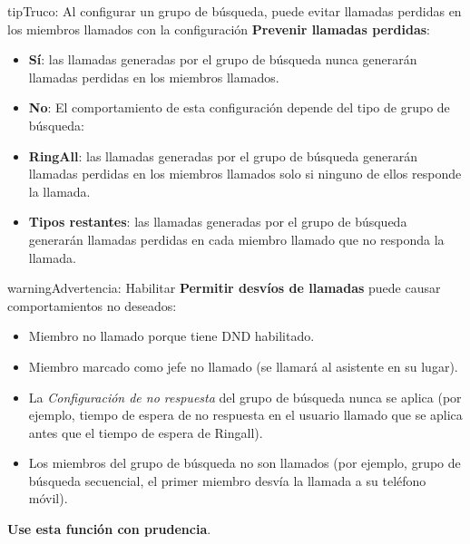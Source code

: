 \documentclass[letterpaper,10pt,spanish]{sphinxmanual}
\begin{document}
\begin{notice}{tip}{Truco:}
Al configurar un grupo de búsqueda, puede evitar llamadas perdidas en los miembros llamados con la configuración \textbf{Prevenir llamadas perdidas}:
\begin{itemize}
\item {} 
\textbf{Sí}: las llamadas generadas por el grupo de búsqueda nunca generarán llamadas perdidas en los miembros llamados.

\item {} 
\textbf{No}: El comportamiento de esta configuración depende del tipo de grupo de búsqueda:

\item {} 
\textbf{RingAll}: las llamadas generadas por el grupo de búsqueda generarán llamadas perdidas en los miembros llamados solo si ninguno de ellos responde la llamada.

\item {} 
\textbf{Tipos restantes}: las llamadas generadas por el grupo de búsqueda generarán llamadas perdidas en cada miembro llamado que no responda la llamada.

\end{itemize}
\end{notice}

\begin{notice}{warning}{Advertencia:}
Habilitar \textbf{Permitir desvíos de llamadas} puede causar comportamientos no deseados:
\begin{itemize}
\item {} 
Miembro no llamado porque tiene DND habilitado.

\item {} 
Miembro marcado como jefe no llamado (se llamará al asistente en su lugar).

\item {} 
La \emph{Configuración de no respuesta} del grupo de búsqueda nunca se aplica (por ejemplo, tiempo de espera de no respuesta en el usuario llamado que se aplica antes que el tiempo de espera de Ringall).

\item {} 
Los miembros del grupo de búsqueda no son llamados (por ejemplo, grupo de búsqueda secuencial, el primer miembro desvía la llamada a su teléfono móvil).

\end{itemize}

\textbf{Use esta función con prudencia}.
\end{notice}
\end{document}
